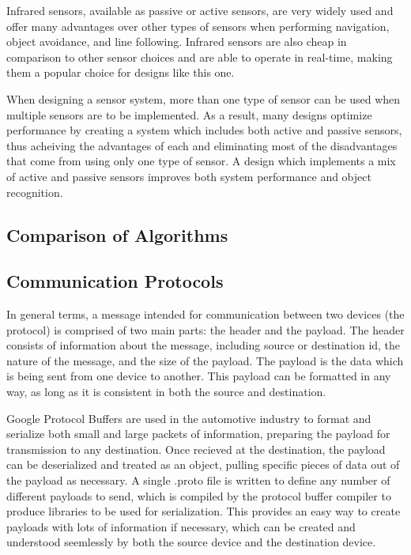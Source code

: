 Infrared sensors, available as passive or active sensors, are very widely used and offer many advantages over other types of sensors when performing navigation, object avoidance, and line following.  Infrared sensors are also cheap in comparison to other sensor choices and are able to operate in real-time, making them a popular choice for designs like this one.\cite{Calin}

When designing a sensor system, more than one type of sensor can be used when multiple sensors are to be implemented.  As a result, many designs optimize performance by creating a system which includes both active and passive sensors, thus acheiving the advantages of each and eliminating most of the disadvantages that come from using only one type of sensor.  A design which implements a mix of active and passive sensors improves both system performance and object recognition. \cite{Discant}  

\subsection*{Comparison of Algorithms}


\subsection*{Communication Protocols}
In general terms, a message intended for communication between two devices (the protocol) is comprised of two main parts: the header and the payload. The header consists of information about the message, including source or destination id, the nature of the message, and the size of the payload. The payload is the data which is being sent from one device to another. This payload can be formatted in any way, as long as it is consistent in both the source and destination.

Google Protocol Buffers \cite{Google:2014} are used in the automotive industry to format and serialize both small and large packets of information, preparing the payload for transmission to any destination. Once recieved at the destination, the payload can be deserialized and treated as an object, pulling specific pieces of data out of the payload as necessary. A single .proto file is written to define any number of different payloads to send, which is compiled by the protocol buffer compiler to produce libraries to be used for serialization. This provides an easy way to create payloads with lots of information if necessary, which can be created and understood seemlessly by both the source device and the destination device.

